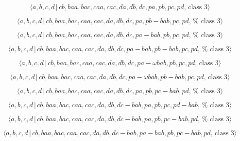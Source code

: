 \documentclass[10pt]{article}
\begin{document}
\begin{equation}
\langle a,b,c,d\,|\,cb,baa,bac,caa,cac,da,db,dc,pa,pb,pc,pd,\,\text{class }%
3\rangle  \tag{7.3737}
\end{equation}

\begin{equation}
\langle a,b,c,d\,|\,cb,baa,bac,caa,cac,da,db,dc,pa,pb-bab,pc,pd,\,\text{%
class }3\rangle  \tag{7.3738}
\end{equation}

\begin{equation}
\langle a,b,c,d\,|\,cb,baa,bac,caa,cac,da,db,dc,pa-bab,pb,pc,pd,\,\text{%
class }3\rangle  \tag{7.3739}
\end{equation}

\begin{equation}
\langle a,b,c,d\,|\,cb,baa,bac,caa,cac,da,db,dc,pa-bab,pb-bab,pc,pd,\,\text{%
class }3\rangle  \tag{7.3740}
\end{equation}

\begin{equation}
\langle a,b,c,d\,|\,cb,baa,bac,caa,cac,da,db,dc,pa-\omega bab,pb,pc,pd,\,%
\text{class }3\rangle  \tag{7.3741}
\end{equation}

\begin{equation}
\langle a,b,c,d\,|\,cb,baa,bac,caa,cac,da,db,dc,pa-\omega bab,pb-bab,pc,pd,\,%
\text{class }3\rangle  \tag{7.3742}
\end{equation}

\begin{equation}
\langle a,b,c,d\,|\,cb,baa,bac,caa,cac,da,db,dc,pa,pb,pc-bab,pd,\,\text{%
class }3\rangle  \tag{7.3743}
\end{equation}

\begin{equation}
\langle a,b,c,d\,|\,cb,baa,bac,caa,cac,da,db,dc-bab,pa,pb,pc,pd-bab,\,\text{%
class }3\rangle  \tag{7.3744}
\end{equation}

\begin{equation}
\langle a,b,c,d\,|\,cb,baa,bac,caa,cac,da,db,dc-bab,pa,pb,pc-bab,pd,\,\text{%
class }3\rangle  \tag{7.3745}
\end{equation}

\begin{equation}
\langle a,b,c,d\,|\,cb,baa,bac,caa,cac,da,db,dc-bab,pa-bab,pb,pc-bab,pd,\,%
\text{class }3\rangle  \tag{7.3746}
\end{equation}
\end{document}
